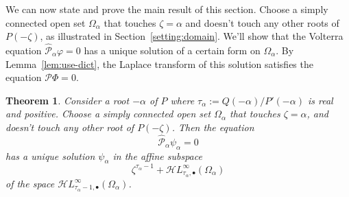 \documentclass{article}
\theoremstyle{plain}
\newtheorem{thm}{Theorem}
\newcommand{\singexp}[2]{\mathcal{H}L^\infty_{#1, #2}}
\newcommand{\singexpalg}[1]{\singexp{#1}{\bullet}}
\newcommand{\domain}{\Omega}
\begin{document}
We can now state and prove the main result of this section. Choose a simply connected open set $\domain_\alpha$ that touches $\zeta = \alpha$ and doesn't touch any other roots of $P(-\zeta)$, as illustrated in Section~\ref{setting:domain}. We'll show that the Volterra equation $\hat{\mathcal{P}}_\alpha \varphi = 0$ has a unique solution of a certain form on $\domain_\alpha$. By Lemma~\ref{lem:use-dict}, the Laplace transform of this solution satisfies the equation $\mathcal{P}\Phi = 0$.
\begin{thm}\label{thm:example}
Consider a root $-\alpha$ of $P$ where $\tau_\alpha := Q(-\alpha)/P'(-\alpha)$ is real and positive. Choose a simply connected open set $\domain_\alpha$ that touches $\zeta = \alpha$, and doesn't touch any other root of $P(-\zeta)$. Then the equation
\[ \hat{\mathcal{P}}_\alpha \psi_\alpha = 0 \]
has a unique solution $\psi_\alpha$ in the affine subspace
\[ \zeta^{\tau_\alpha-1} + \singexpalg{\tau_\alpha}(\domain_\alpha) \]
of the space $\singexpalg{\tau_\alpha-1}(\domain_\alpha)$.
\end{thm}
\end{document}
